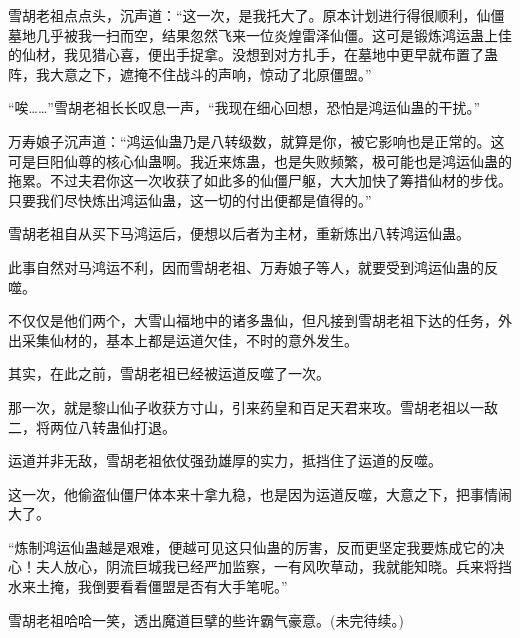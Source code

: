 \begin{this_body}
雪胡老祖点点头，沉声道：“这一次，是我托大了。原本计划进行得很顺利，仙僵墓地几乎被我一扫而空，结果忽然飞来一位炎煌雷泽仙僵。这可是锻炼鸿运蛊上佳的仙材，我见猎心喜，便出手捉拿。没想到对方扎手，在墓地中更早就布置了蛊阵，我大意之下，遮掩不住战斗的声响，惊动了北原僵盟。”

“唉……”雪胡老祖长长叹息一声，“我现在细心回想，恐怕是鸿运仙蛊的干扰。”

万寿娘子沉声道：“鸿运仙蛊乃是八转级数，就算是你，被它影响也是正常的。这可是巨阳仙尊的核心仙蛊啊。我近来炼蛊，也是失败频繁，极可能也是鸿运仙蛊的拖累。不过夫君你这一次收获了如此多的仙僵尸躯，大大加快了筹措仙材的步伐。只要我们尽快炼出鸿运仙蛊，这一切的付出便都是值得的。”

雪胡老祖自从买下马鸿运后，便想以后者为主材，重新炼出八转鸿运仙蛊。

此事自然对马鸿运不利，因而雪胡老祖、万寿娘子等人，就要受到鸿运仙蛊的反噬。

不仅仅是他们两个，大雪山福地中的诸多蛊仙，但凡接到雪胡老祖下达的任务，外出采集仙材的，基本上都是运道欠佳，不时的意外发生。

其实，在此之前，雪胡老祖已经被运道反噬了一次。

那一次，就是黎山仙子收获方寸山，引来药皇和百足天君来攻。雪胡老祖以一敌二，将两位八转蛊仙打退。

运道并非无敌，雪胡老祖依仗强劲雄厚的实力，抵挡住了运道的反噬。

这一次，他偷盗仙僵尸体本来十拿九稳，也是因为运道反噬，大意之下，把事情闹大了。

“炼制鸿运仙蛊越是艰难，便越可见这只仙蛊的厉害，反而更坚定我要炼成它的决心！夫人放心，阴流巨城我已经严加监察，一有风吹草动，我就能知晓。兵来将挡水来土掩，我倒要看看僵盟是否有大手笔呢。”

雪胡老祖哈哈一笑，透出魔道巨擘的些许霸气豪意。(未完待续。)

\end{this_body}

